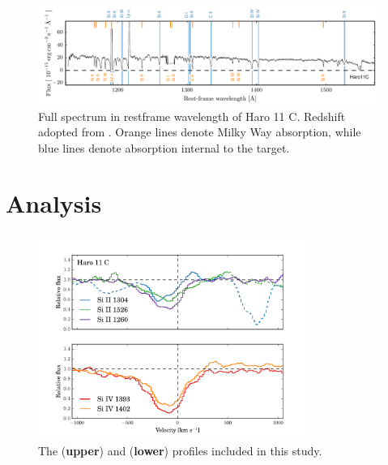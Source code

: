 \documentclass[preprint2]{aastex6}
\begin{document}
\begin{figure}
\centering
\includegraphics[]{../Figs/FullSpec.pdf}
\caption{Full spectrum in restframe wavelength of Haro 11 C. Redshift
adopted from \citet{Sandberg2013}. Orange lines denote Milky Way
absorption, while blue lines denote absorption internal to the
target.}\label{fig:fullspec}
\end{figure}

\section{Analysis}\label{analysis}

\begin{figure}
\centering
\includegraphics[width=3.500in]{../Figs/HISLISProfiles.pdf}
\caption{The  (\textbf{upper}) and 
(\textbf{lower}) profiles included in this
study.}\label{fig:SingleLines}
\end{figure}
\end{document}
